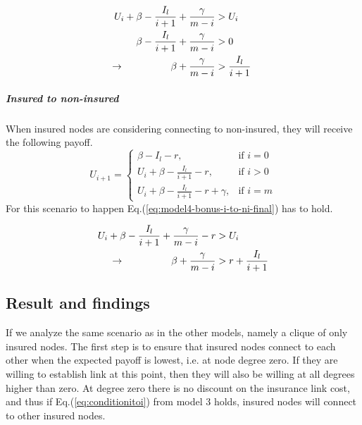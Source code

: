 \begin{eqnarray}
U_{i}+\beta-\frac{I_{l}}{i+1}+\frac{\gamma}{m-i}&>U_{i} \nonumber \\ 
\beta-\frac{I_{l}}{i+1}+\frac{\gamma}{m-i}&>0 \nonumber \\ 
\llap{$\rightarrow$\hspace{50pt}}\beta +\frac{\gamma}{m-i}&>\frac{I_{l}}{i+1}
\label{eq:model4-bonus-i-to-i}
\end{eqnarray}

\subparagraph{Insured to non-insured}
When insured nodes are considering connecting to non-insured, they will receive the following payoff.
\begin{equation}
U_{i+1}= 
\begin{cases}
    \beta - I_{l}-r,& \text{if } i = 0\\
    U_{i}+\beta -\frac{I_{l}}{i+1}-r,& \text{if }  i>0\\
    U_{i}+\beta -\frac{I_{l}}{i+1}-r+\gamma,& \text{if } i=m
\end{cases}
\label{eq:model4-bonus-i-to-ni}
\end{equation}
For this scenario to happen Eq.(\ref{eq:model4-bonus-i-to-ni-final}) has to hold.

\begin{eqnarray}
U_{i}+\beta-\frac{I_{l}}{i+1}+\frac{\gamma}{m-i}-r&>U_{i} \nonumber \\ 
\llap{$\rightarrow$\hspace{50pt}}\beta+\frac{\gamma}{m-i}&>r+\frac{I_{l}}{i+1}
\label{eq:model4-bonus-i-to-ni-final}
\end{eqnarray}

\subsection{Result and findings}
If we analyze the same scenario as in the other models, namely a clique of only insured nodes. The first step is to ensure that insured nodes connect to each other when the expected payoff is lowest, i.e. at node degree zero. If they are willing to establish link at this point, then they will also be willing at all degrees higher than zero.
At degree zero there is no discount on the insurance link cost, and thus if Eq.(\ref{eq:conditionitoi}) from model 3 holds, insured nodes will connect to other insured nodes.

